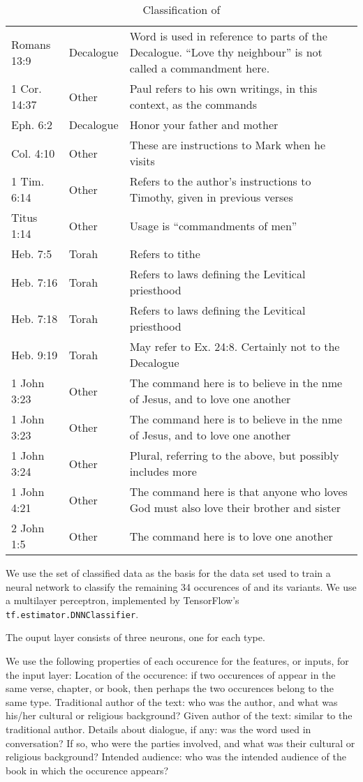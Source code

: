 \documentclass{article}
\newcommand{\entole}{\textepsilon\textnu\texttau\textomikron\textlambda\textepsilon\xspace}
\begin{document}
\begin{table}
\begin{tabularx}{\textwidth}{@{}llX@{}}
    Romans 13:9 & Decalogue & Word is used in reference to parts of the Decalogue.  ``Love thy neighbour'' is not called a commandment here.\\
    1 Cor. 14:37 & Other & Paul refers to his own writings, in this context, as the commands\\
    Eph. 6:2 & Decalogue & Honor your father and mother\\
    Col. 4:10 & Other & These are instructions to Mark when he visits\\
    1 Tim. 6:14 & Other & Refers to the author's instructions to Timothy, given in previous verses\\
    Titus 1:14 & Other & Usage is ``commandments of men''\\
    Heb. 7:5 & Torah & Refers to tithe\\
    Heb. 7:16 & Torah & Refers to laws defining the Levitical priesthood\\
    Heb. 7:18 & Torah & Refers to laws defining the Levitical priesthood\\
    Heb. 9:19 & Torah & May refer to Ex. 24:8.  Certainly not to the Decalogue\\
    1 John 3:23 & Other & The command here is to believe in the nme of Jesus, and to love one another\\
    1 John 3:23 & Other & The command here is to believe in the nme of Jesus, and to love one another\\
    1 John 3:24 & Other & Plural, referring to the above, but possibly includes more\\
    1 John 4:21 & Other & The command here is that anyone who loves God must also love their brother and sister\\
    2 John 1:5 & Other & The command here is to love one another\\
    \bottomrule
\end{tabularx}
    \caption{Classification of \entole}
    \label{training}
\end{table}

We use the set of classified data as the basis for the data set used to train a neural network to classify the remaining 34
occurences of \entole and its variants.  
We use a multilayer perceptron, implemented by TensorFlow's \texttt{tf.estimator.DNNClassifier}.

The ouput layer consists of three neurons, one for each type.

We use the following properties of each occurence for the features, or inputs, for the input layer:
Location of the occurence: if two occurences of \entole appear in the same verse, chapter, or book,
then perhaps the two occurences belong to the same type.  Traditional author of the text: who was
the author, and what was his/her cultural or religious background?  Given author of the text: similar
to the traditional author.  Details about dialogue, if any: was the word used in conversation?  If so,
who were the parties involved, and what was their cultural or religious background?  Intended audience:
who was the intended audience of the book in which the occurence appears?
\end{document}
